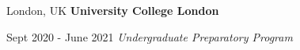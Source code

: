         \vspace{0.10 cm}
 
        \begin{twocolentry}{
            London, UK
        }
            {\ResumeEntryTitleFont\textbf{University College London}}
        \end{twocolentry}
        \begin{twocolentry}{
            Sept 2020 - June 2021
        }
            \textit{Undergraduate Preparatory Program}
        \end{twocolentry}
